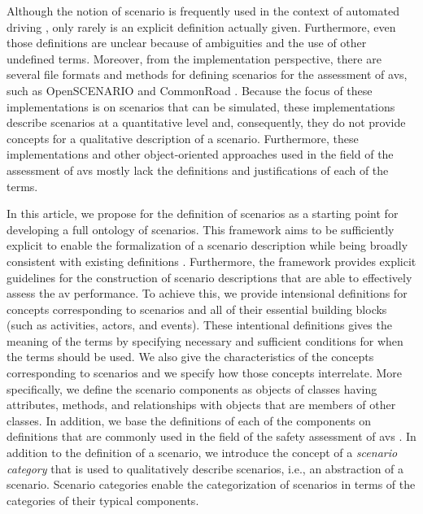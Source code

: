 Although the notion of scenario is frequently used in the context of automated driving \autocite{gietelink2006development, ebner2011identifying, hulshof2013autonomous, xiong2015orchestration, zofka2015datadrivetrafficscenarios, putz2017pegasus, roesener2017comprehensive, shao2019evaluating}, \cendc\cstartd only rarely is an explicit definition actually given. 
Furthermore, even those definitions are unclear because of ambiguities and the use of other undefined terms. \cendd
\cstartf Moreover, \cendf\cstartc from the implementation perspective, there are several file formats and methods for defining scenarios for the assessment of \acp{av}, such as OpenSCENARIO \autocite{openscenario} and CommonRoad \autocite{althoff2017CommonRoad}.
Because the focus of these implementations is on scenarios that can be simulated, these implementations describe scenarios at a quantitative level and, consequently, they do not provide concepts for a qualitative description of a scenario.
Furthermore, these implementations and other object-oriented approaches used in the field of the assessment of \acp{av} \autocite{tsai2003scenario, utting2012taxonomy, zofka2016testing, wittmann2017method} \cstartf mostly \cendf lack the definitions and justifications of each of the terms.

In this article, we propose  for the definition of scenarios \cendc\cstartd as a starting point for developing a full ontology of scenarios. 
This framework aims to be sufficiently explicit to enable the formalization of a scenario description while being broadly consistent with existing definitions \autocite{geyer2014, ulbrich2015, elrofai2016scenario}. \cendd\cstartc 
Furthermore, the framework provides explicit guidelines for the construction of scenario descriptions that are able to effectively assess the \ac{av} performance.
To achieve this, \cendc\cstartd we provide intensional definitions for concepts corresponding to scenarios and all of their \cendd\cstartc essential building blocks (such as activities, actors, and events). \cendc
\cstartf These intentional definitions gives the meaning of the terms by specifying necessary and sufficient conditions for when the terms should be used. \cendf
\cstartc We also give the characteristics of the concepts corresponding to scenarios and we specify how those concepts interrelate. 
\cendc\cstartd More specifically, we define the scenario components \cendd\cstartc as objects of classes having attributes, methods, and relationships with objects that are members of other classes.
\cendc\cstartd In addition, we base the definitions of each of the components on definitions \cendd\cstartc that are commonly used in the field of the safety assessment of \acp{av} \autocite{geyer2014, ulbrich2015, catapult2018musicc, catapult2018regulating, sigsim2019glossary, openscenario}. 
In addition to the definition of a scenario, we introduce the concept of a \emph{scenario category} that is used to qualitatively describe scenarios, i.e., an abstraction of a scenario. Scenario categories enable the categorization of scenarios in terms of the categories of their typical components.

